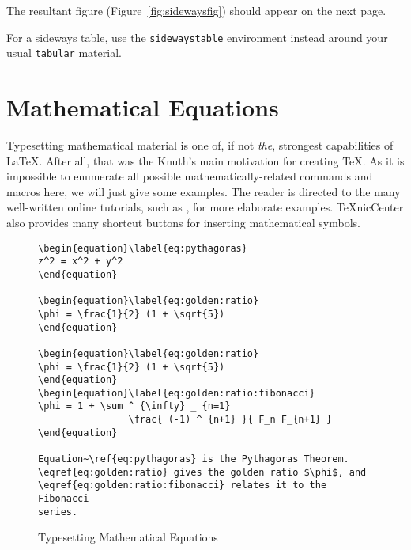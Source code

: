 The resultant figure (Figure~\ref{fig:sidewaysfig}) should appear on the next page.

For a sideways table, use the \verb|sidewaystable| environment instead around your usual \verb|tabular| material.


\section{Mathematical Equations}


Typesetting mathematical material is one of, if not \emph{the}, strongest capabilities of \LaTeX.  After all, that was the Knuth's main motivation for creating \TeX{}.  As it is impossible to enumerate all possible mathematically-related commands and macros here, we will just give some examples.  The reader is directed to the many well-written online tutorials, such as \citep{roberts}, for more elaborate examples.  TeXnicCenter also provides many shortcut buttons for inserting mathematical symbols.

\begin{figure}[htb!]
\begin{lstlisting}
\begin{equation}\label{eq:pythagoras}
z^2 = x^2 + y^2
\end{equation}

\begin{equation}\label{eq:golden:ratio}
\phi = \frac{1}{2} (1 + \sqrt{5})
\end{equation}

\begin{equation}\label{eq:golden:ratio}
\phi = \frac{1}{2} (1 + \sqrt{5})
\end{equation}
\begin{equation}\label{eq:golden:ratio:fibonacci}
\phi = 1 + \sum ^ {\infty} _ {n=1}
                \frac{ (-1) ^ {n+1} }{ F_n F_{n+1} }
\end{equation}

Equation~\ref{eq:pythagoras} is the Pythagoras Theorem. 
\eqref{eq:golden:ratio} gives the golden ratio $\phi$, and 
\eqref{eq:golden:ratio:fibonacci} relates it to the Fibonacci 
series.
\end{lstlisting}
\caption{Typesetting Mathematical Equations}\label{fig:lst:equation}
\end{figure}

